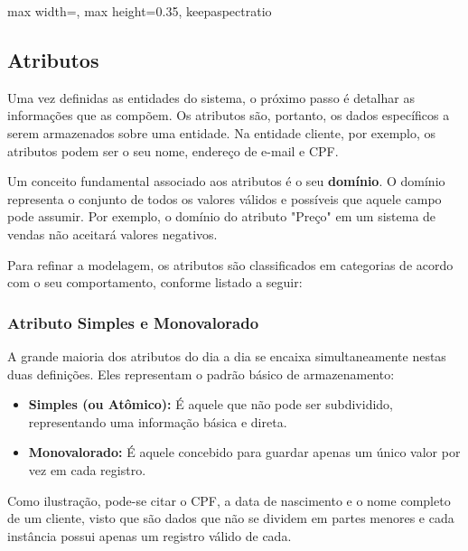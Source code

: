 \begin{diagramER}
    \begin{center}
    \begin{adjustbox}{max width=\linewidth, max height=0.35\textheight, keepaspectratio}
\end{adjustbox}
    \end{center}
\end{diagramER}

\subsection{Atributos}
Uma vez definidas as entidades do sistema, o próximo passo é detalhar as informações que as compõem. Os atributos são, portanto, os dados específicos a serem armazenados sobre uma entidade. Na entidade cliente, por exemplo, os atributos podem ser o seu nome, endereço de e-mail e CPF. 

Um conceito fundamental associado aos atributos é o seu \textbf{domínio}. O domínio representa o conjunto de todos os valores válidos e possíveis que aquele campo pode assumir. Por exemplo, o domínio do atributo "Preço" em um sistema de vendas não aceitará valores negativos.

Para refinar a modelagem, os atributos são classificados em categorias de acordo com o seu comportamento, conforme listado a seguir:

\subsubsection{Atributo Simples e Monovalorado}
A grande maioria dos atributos do dia a dia se encaixa simultaneamente nestas duas definições. Eles representam o padrão básico de armazenamento:
\begin{itemize}
    \item \textbf{Simples (ou Atômico):} É aquele que não pode ser subdividido, representando uma informação básica e direta.
    \item \textbf{Monovalorado:} É aquele concebido para guardar apenas um único valor por vez em cada registro.
\end{itemize}
Como ilustração, pode-se citar o CPF, a data de nascimento e o nome completo de um cliente, visto que são dados que não se dividem em partes menores e cada instância possui apenas um registro válido de cada.

